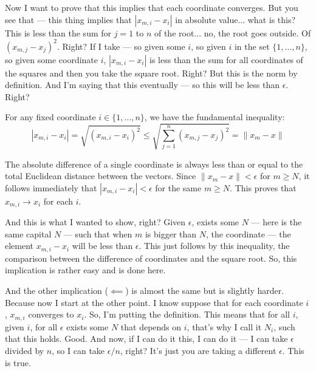 \begin{spoken-clean}[00:18:42 - 00:20:12]
Now I want to prove that this implies that each coordinate converges. But you see that ---  this thing implies that $|x_{m,i} - x_i|$ in absolute value... what is this? This is less than the sum for $j=1$ to $n$ of the root... no, the root goes outside. Of $(x_{m,j} - x_j)^2$. Right? If I take --- so given some $i$, so given $i$ in the set $\{1, \dots, n\}$, so given some coordinate $i$, $|x_{m,i} - x_i|$ is less than the sum for all coordinates of the squares and then you take the square root. Right? But this is the norm by definition. And I'm saying that this eventually --- so this will be less than $\epsilon$. Right?
\end{spoken-clean}

\begin{math-stroke}
For any fixed coordinate $i \in \{1, \dots, n\}$, we have the fundamental inequality:
\begin{equation}\label{eq:coord-norm-bound}
|x_{m,i} - x_i| = \sqrt{(x_{m,i} - x_i)^2} \le \sqrt{\sum_{j=1}^n (x_{m,j} - x_j)^2} = \|x_m - x\|
\end{equation}
\begin{explanation-of-steps}
The absolute difference of a single coordinate is always less than or equal to the total Euclidean distance between the vectors. Since $\|x_m - x\| < \epsilon$ for $m \ge N$, it follows immediately that $|x_{m,i} - x_i| < \epsilon$ for the same $m \ge N$. This proves that $x_{m,i} \to x_i$ for each $i$.
\end{explanation-of-steps}
\end{math-stroke}

\begin{spoken-clean}[00:20:12 - 00:21:30]
And this is what I wanted to show, right? Given $\epsilon$, exists some $N$ --- here is the same capital $N$ --- such that when $m$ is bigger than $N$, the coordinate --- the element $x_{m,i} - x_i$ will be less than $\epsilon$. This just follows by this inequality, the comparison between the difference of coordinates and the square root. So, this implication is rather easy and is done here. 
\end{spoken-clean}

\begin{spoken-clean}[00:21:30 - 00:22:55]
And the other implication ($\impliedby$) is almost the same but is slightly harder. Because now I start at the other point. I know suppose that for each coordinate $i$, $x_{m,i}$ converges to $x_i$. So, I'm putting the definition.  This means that for all $i$, given $i$, for all $\epsilon$ exists some $N$ that depends on $i$, that's why I call it $N_i$, such that this holds. Good. And now, if I can do it this, I can do it --- I can take $\epsilon$ divided by $n$, so I can take $\epsilon/n$, right? It's just you are taking a different $\epsilon$. This is true.
\end{spoken-clean}

